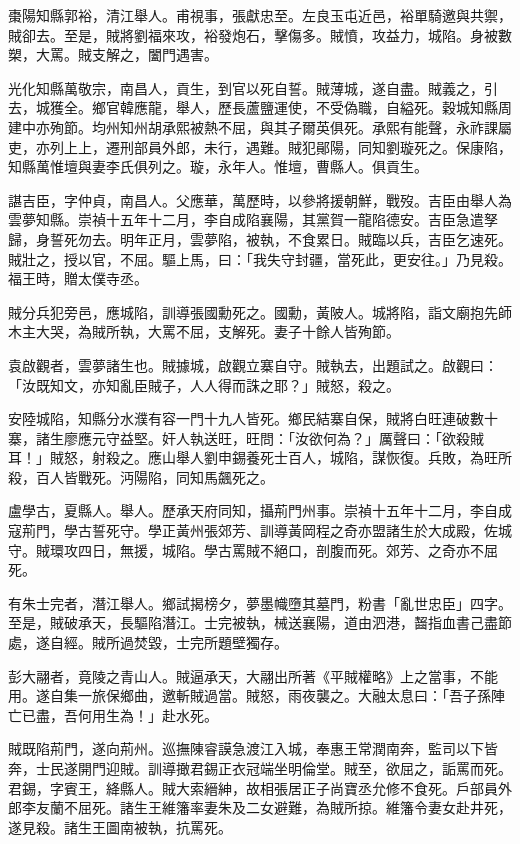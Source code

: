 \begin{pinyinscope}
棗陽知縣郭裕，清江舉人。甫視事，張獻忠至。左良玉屯近邑，裕單騎邀與共禦，賊卻去。至是，賊將劉福來攻，裕發炮石，擊傷多。賊憤，攻益力，城陷。身被數槊，大罵。賊支解之，闔門遇害。

光化知縣萬敬宗，南昌人，貢生，到官以死自誓。賊薄城，遂自盡。賊義之，引去，城獲全。鄉官韓應龍，舉人，歷長蘆鹽運使，不受偽職，自縊死。穀城知縣周建中亦殉節。均州知州胡承熙被熱不屈，與其子爾英俱死。承熙有能聲，永祚課屬吏，亦列上上，遷刑部員外郎，未行，遇難。賊犯鄖陽，同知劉璇死之。保康陷，知縣萬惟壇與妻李氏俱列之。璇，永年人。惟壇，曹縣人。俱貢生。

諶吉臣，字仲貞，南昌人。父應華，萬歷時，以參將援朝鮮，戰歿。吉臣由舉人為雲夢知縣。崇禎十五年十二月，李自成陷襄陽，其黨賀一龍陷德安。吉臣急遣孥歸，身誓死勿去。明年正月，雲夢陷，被執，不食累日。賊臨以兵，吉臣乞速死。賊壯之，授以官，不屈。驅上馬，曰：「我失守封疆，當死此，更安往。」乃見殺。福王時，贈太僕寺丞。

賊分兵犯旁邑，應城陷，訓導張國勳死之。國勳，黃陂人。城將陷，詣文廟抱先師木主大哭，為賊所執，大罵不屈，支解死。妻子十餘人皆殉節。

袁啟觀者，雲夢諸生也。賊據城，啟觀立寨自守。賊執去，出題試之。啟觀曰：「汝既知文，亦知亂臣賊子，人人得而誅之耶？」賊怒，殺之。

安陸城陷，知縣分水濮有容一門十九人皆死。鄉民結寨自保，賊將白旺連破數十寨，諸生廖應元守益堅。奸人執送旺，旺問：「汝欲何為？」厲聲曰：「欲殺賊耳！」賊怒，射殺之。應山舉人劉申錫養死士百人，城陷，謀恢復。兵敗，為旺所殺，百人皆戰死。沔陽陷，同知馬飆死之。

盧學古，夏縣人。舉人。歷承天府同知，攝荊門州事。崇禎十五年十二月，李自成寇荊門，學古誓死守。學正黃州張郊芳、訓導黃岡程之奇亦盟諸生於大成殿，佐城守。賊環攻四日，無援，城陷。學古罵賊不絕口，剖腹而死。郊芳、之奇亦不屈死。

有朱士完者，潛江舉人。鄉試揭榜夕，夢墨幟墮其墓門，粉書「亂世忠臣」四字。至是，賊破承天，長驅陷潛江。士完被執，械送襄陽，道由泗港，齧指血書己盡節處，遂自經。賊所過焚毀，士完所題壁獨存。

彭大翮者，竟陵之青山人。賊逼承天，大翮出所著《平賊權略》上之當事，不能用。遂自集一旅保鄉曲，邀斬賊過當。賊怒，雨夜襲之。大融太息曰：「吾子孫陣亡已盡，吾何用生為！」赴水死。

賊既陷荊門，遂向荊州。巡撫陳睿謨急渡江入城，奉惠王常潤南奔，監司以下皆奔，士民遂開門迎賊。訓導撖君錫正衣冠端坐明倫堂。賊至，欲屈之，詬罵而死。君錫，字賓王，絳縣人。賊大索縉紳，故相張居正子尚寶丞允修不食死。戶部員外郎李友蘭不屈死。諸生王維籓率妻朱及二女避難，為賊所掠。維籓令妻女赴井死，遂見殺。諸生王圖南被執，抗罵死。


\end{pinyinscope}

